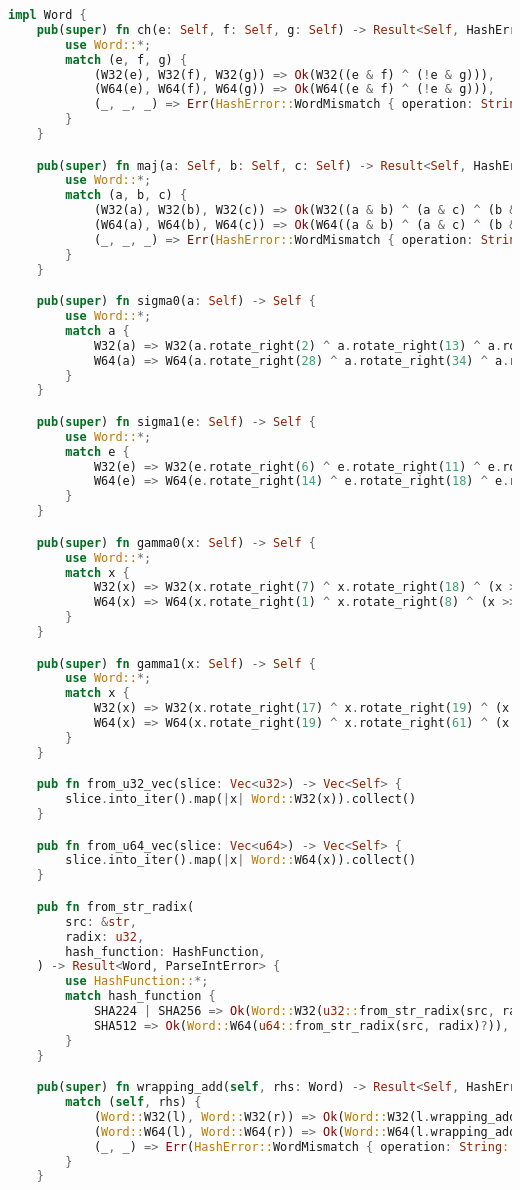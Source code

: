 \begin{lstlisting}[language=rust, caption={sha/structs.rs}]
impl Word {
	pub(super) fn ch(e: Self, f: Self, g: Self) -> Result<Self, HashError> {
		use Word::*;
		match (e, f, g) {
			(W32(e), W32(f), W32(g)) => Ok(W32((e & f) ^ (!e & g))),
			(W64(e), W64(f), W64(g)) => Ok(W64((e & f) ^ (!e & g))),
			(_, _, _) => Err(HashError::WordMismatch { operation: String::from("ch")}),
		}
	}

	pub(super) fn maj(a: Self, b: Self, c: Self) -> Result<Self, HashError> {
		use Word::*;
		match (a, b, c) {
			(W32(a), W32(b), W32(c)) => Ok(W32((a & b) ^ (a & c) ^ (b & c))),
			(W64(a), W64(b), W64(c)) => Ok(W64((a & b) ^ (a & c) ^ (b & c))),
			(_, _, _) => Err(HashError::WordMismatch { operation: String::from("maj")}),
		}
	}

	pub(super) fn sigma0(a: Self) -> Self {
		use Word::*;
		match a {
			W32(a) => W32(a.rotate_right(2) ^ a.rotate_right(13) ^ a.rotate_right(22)),
			W64(a) => W64(a.rotate_right(28) ^ a.rotate_right(34) ^ a.rotate_right(39)),
		}
	}

	pub(super) fn sigma1(e: Self) -> Self {
		use Word::*;
		match e {
			W32(e) => W32(e.rotate_right(6) ^ e.rotate_right(11) ^ e.rotate_right(25)),
			W64(e) => W64(e.rotate_right(14) ^ e.rotate_right(18) ^ e.rotate_right(41)),
		}
	}

	pub(super) fn gamma0(x: Self) -> Self {
		use Word::*;
		match x {
			W32(x) => W32(x.rotate_right(7) ^ x.rotate_right(18) ^ (x >> 3)),
			W64(x) => W64(x.rotate_right(1) ^ x.rotate_right(8) ^ (x >> 7)),
		}
	}

	pub(super) fn gamma1(x: Self) -> Self {
		use Word::*;
		match x {
			W32(x) => W32(x.rotate_right(17) ^ x.rotate_right(19) ^ (x >> 10)),
			W64(x) => W64(x.rotate_right(19) ^ x.rotate_right(61) ^ (x >> 6)),
		}
	}

	pub fn from_u32_vec(slice: Vec<u32>) -> Vec<Self> {
		slice.into_iter().map(|x| Word::W32(x)).collect()
	}

	pub fn from_u64_vec(slice: Vec<u64>) -> Vec<Self> {
		slice.into_iter().map(|x| Word::W64(x)).collect()
	}

	pub fn from_str_radix(
		src: &str,
		radix: u32,
		hash_function: HashFunction,
	) -> Result<Word, ParseIntError> {
		use HashFunction::*;
		match hash_function {
			SHA224 | SHA256 => Ok(Word::W32(u32::from_str_radix(src, radix)?)),
			SHA512 => Ok(Word::W64(u64::from_str_radix(src, radix)?)),
		}
	}

	pub(super) fn wrapping_add(self, rhs: Word) -> Result<Self, HashError> {
		match (self, rhs) {
			(Word::W32(l), Word::W32(r)) => Ok(Word::W32(l.wrapping_add(r))),
			(Word::W64(l), Word::W64(r)) => Ok(Word::W64(l.wrapping_add(r))),
			(_, _) => Err(HashError::WordMismatch { operation: String::from("wrapping add")})
		}
	}


\end{lstlisting}
